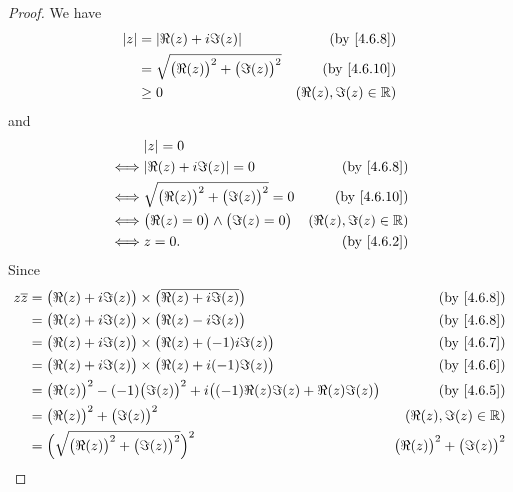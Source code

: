 \begin{proof}
  We have
  \begin{align*}
    \abs{z} & = \abs{\Re(z) + i \Im(z)}                        & \text{(by \cref{4.6.8})}  \\
            & = \sqrt{\big(\Re(z)\big)^2 + \big(\Im(z)\big)^2} & \text{(by \cref{4.6.10})} \\
            & \geq 0                                           & (\Re(z), \Im(z) \in \R)
  \end{align*}
  and
  \begin{align*}
         & \abs{z} = 0                                                                    \\
    \iff & \abs{\Re(z) + i \Im(z)} = 0                        & \text{(by \cref{4.6.8})}  \\
    \iff & \sqrt{\big(\Re(z)\big)^2 + \big(\Im(z)\big)^2} = 0 & \text{(by \cref{4.6.10})} \\
    \iff & \big(\Re(z) = 0\big) \land \big(\Im(z) = 0\big)    & (\Re(z), \Im(z) \in \R)   \\
    \iff & z = 0.                                             & \text{(by \cref{4.6.2})}
  \end{align*}
  Since
  \begin{align*}
    z \overline{z} & = \big(\Re(z) + i \Im(z)\big) \times \big(\overline{\Re(z) + i \Im(z)}\big)                     & \text{(by \cref{4.6.8})}                \\
                   & = \big(\Re(z) + i \Im(z)\big) \times \big(\Re(z) - i \Im(z)\big)                                & \text{(by \cref{4.6.8})}                \\
                   & = \big(\Re(z) + i \Im(z)\big) \times \big(\Re(z) + (-1) i \Im(z)\big)                           & \text{(by \cref{4.6.7})}                \\
                   & = \big(\Re(z) + i \Im(z)\big) \times \big(\Re(z) + i (-1) \Im(z)\big)                           & \text{(by \cref{4.6.6})}                \\
                   & = \big(\Re(z)\big)^2 - (-1) \big(\Im(z)\big)^2 + i \big((-1) \Re(z) \Im(z) + \Re(z) \Im(z)\big) & \text{(by \cref{4.6.5})}                \\
                   & = \big(\Re(z)\big)^2 + \big(\Im(z)\big)^2                                                       & (\Re(z), \Im(z) \in \R)                 \\
                   & = \Big(\sqrt{\big(\Re(z)\big)^2 + \big(\Im(z)\big)^2}\Big)^2                                    & \big(\Re(z)\big)^2 + \big(\Im(z)\big)^2 \\

\end{align*}
\end{proof}
